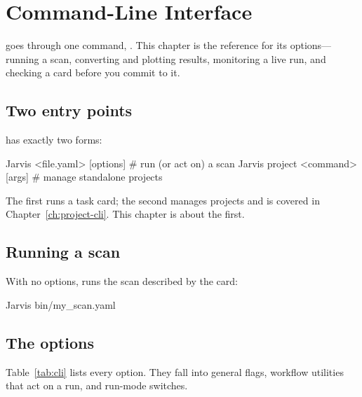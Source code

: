 \chapter{Command-Line Interface}
\label{ch:cli}

 goes through one command, . This chapter is
the reference for its options---running a scan, converting and plotting results, monitoring a live
run, and checking a card before you commit to it.

\section{Two entry points}
\label{sec:cli-entry}

 has exactly two forms:

\begin{shellbox}
Jarvis <file.yaml> [options]      # run (or act on) a scan
Jarvis project <command> [args]   # manage standalone projects
\end{shellbox}

\noindent The first runs a task card; the second manages projects and is covered in
Chapter~\ref{ch:project-cli}. This chapter is about the first.

\section{Running a scan}
\label{sec:cli-run}

With no options,  runs the scan described by the card:

\begin{shellbox}
Jarvis bin/my_scan.yaml
\end{shellbox}

\section{The options}
\label{sec:cli-options}

Table~\ref{tab:cli} lists every option. They fall into general flags, workflow utilities that act
on a run, and run-mode switches.

